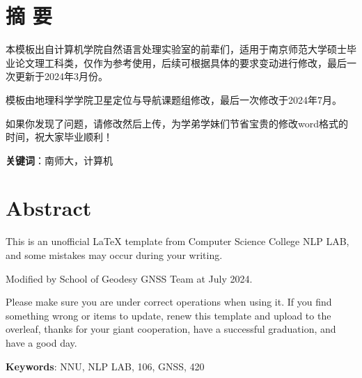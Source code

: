 
{\centering\section*{摘 \quad 要}}
{}
\pagestyle{fancy}
\fancyhf{}
本模板出自计算机学院自然语言处理实验室的前辈们，适用于南京师范大学硕士毕业论文理工科类，仅作为参考使用，后续可根据具体的要求变动进行修改，最后一次更新于2024年3月份。

模板由地理科学学院卫星定位与导航课题组修改，最后一次修改于2024年7月。

如果你发现了问题，请修改然后上传，为学弟学妹们节省宝贵的修改word格式的时间，祝大家毕业顺利！


\par\noindent\textbf{关键词}：南师大，计算机

\newpage %
{\centering\section*{Abstract}} 
{}%


This is an unofficial \LaTeX{} template from Computer Science College NLP LAB, and some mistakes may occur during your writing. 

Modified by School of Geodesy GNSS Team at July 2024.

Please make sure you are under correct operations when using it. If you find something wrong or items to update, renew this template and upload to the overleaf, thanks for your giant cooperation, have a successful graduation, and have a good day. 

\par\noindent\textbf{Keywords}: NNU, NLP LAB, 106, GNSS, 420